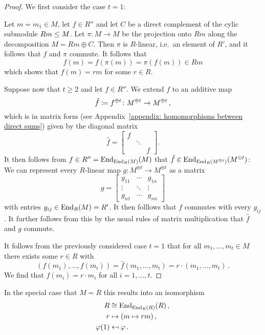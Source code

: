 \begin{proof}
  We first consider the case $t = 1$:
  
  Let $m = m_1 \in M$, let $f \in R''$ and let $C$ be a direct complement of the cylic submodule $Rm \leq M$.
  Let $\pi \colon M \to M$ be the projection onto $Rm$ along the decomposition $M = Rm \oplus C$.
  Then $\pi$ is $R$-linear, i.e.\ an element of $R'$, and it follows that $f$ and $\pi$ commute.
  It follows that
  \[
        f(m)
    =   f(\pi(m))
    =   \pi(f(m))
    \in Rm
  \]
  which shows that $f(m) = rm$ for some $r \in R$.
  
  Suppose now that $t \geq 2$ and let $f \in R''$.
  We extend $f$ to an additive map
  \[
              \hat{f}
    \coloneqq  f^{\oplus t}
    \colon    M^{\oplus t}
    \to       M^{\oplus t} \,,
  \]
  which is in matrix form (see Appendix~\ref{appendix: homomorphisms between direct sums}) given by the diagonal matrix
  \[
      \hat{f}
    = \begin{bmatrix}
        f &         &   \\  
          & \ddots  &   \\
          &         & f
      \end{bmatrix}.
  \]
  It then follows from $f \in R'' = \operatorname{End}_{\operatorname{End}_R(M)}(M)$ that $\hat{f} \in \operatorname{End}_{\operatorname{End}_R(M^{\oplus t})}(M^{\oplus t})$:
  We can represent every $R$-linear map $g \colon M^{\oplus t} \to M^{\oplus t}$ as a matrix
  \[
      g
    = \begin{bmatrix}
        g_{11}  & \cdots  & g_{1n}  \\
        \vdots  & \ddots  & \vdots  \\
        g_{n1}  & \cdots  & g_{nn}
      \end{bmatrix}
  \]
  with entries $g_{ij} \in \operatorname{End}_R(M) = R'$.
  It then folllows that $f$ commutes with every $g_{ij}$.
  It further follows from this by the usual rules of matrix multiplication that $\hat{f}$ and $g$ commute.
  
  It follows from the previously considered case $t = 1$ that for all $m_1, \dotsc, m_t \in M$ there exists some $r \in R$ with
  \[
      (f(m_1), \dotsc, f(m_t))
    = \hat{f}(m_1, \dotsc, m_t)
    = r \cdot (m_1, \dotsc, m_t) \,.
  \]
  We find that $f(m_i) = r \cdot m_i$ for all $i = 1, \dotsc, t$.
\end{proof}


\noindent\hrulefill


\begin{remark}
  In the special case that $M = R$ this results into an isomorphism
  \begin{align*}
                R
    &\cong      \operatorname{End}_{\operatorname{End}_R(R)}(R) \,, \\
                r
    &\mapsto    (m \mapsto rm) \,,  \\
                \varphi(1)
    &\mapsfrom  \varphi \,.
  \end{align*}
\end{remark}


